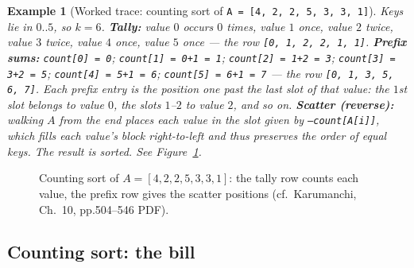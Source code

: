 \documentclass[11pt]{article}
\newtheorem{example}{Example}[section]
\begin{document}
\begin{example}[Worked trace: counting sort of \texttt{A = [4, 2, 2, 5, 3, 3, 1]}]
Keys lie in $0..5$, so $k = 6$. \textbf{Tally:} value $0$ occurs $0$ times, value $1$ once, value $2$ twice, value $3$ twice, value $4$ once, value $5$ once --- the row \texttt{[0, 1, 2, 2, 1, 1]}. \textbf{Prefix sums:} \texttt{count[0] = 0}; \texttt{count[1] = 0+1 = 1}; \texttt{count[2] = 1+2 = 3}; \texttt{count[3] = 3+2 = 5}; \texttt{count[4] = 5+1 = 6}; \texttt{count[5] = 6+1 = 7} --- the row \texttt{[0, 1, 3, 5, 6, 7]}. Each prefix entry is the position one past the last slot of that value: the $1$st slot belongs to value $0$, the slots $1$--$2$ to value $2$, and so on. \textbf{Scatter (reverse):} walking $A$ from the end places each value in the slot given by \texttt{--count[A[i]]}, which fills each value's block right-to-left and thus preserves the order of equal keys. The result is sorted. See Figure~\ref{fig:counting}.
\end{example}

\begin{figure}[h]
  \centering
  \caption{Counting sort of $A = [4, 2, 2, 5, 3, 3, 1]$: the tally row counts each value, the prefix row gives the scatter positions (cf.\ Karumanchi, Ch.~10, pp.504--546 PDF).}
  \label{fig:counting}
\end{figure}

\subsection{Counting sort: the bill}
\end{document}
